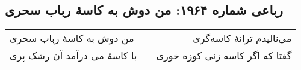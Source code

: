 \begin{center}
\section*{رباعی شماره ۱۹۶۴: من دوش به کاسهٔ رباب سحری}
\label{sec:1964}
\begin{longtable}{l p{0.5cm} r}
من دوش به کاسهٔ رباب سحری
&&
می‌نالیدم ترانهٔ کاسه‌گری
\\
با کاسهٔ می درآمد آن رشک پری
&&
گفتا که اگر کاسه زنی کوزه خوری
\\
\end{longtable}
\end{center}
